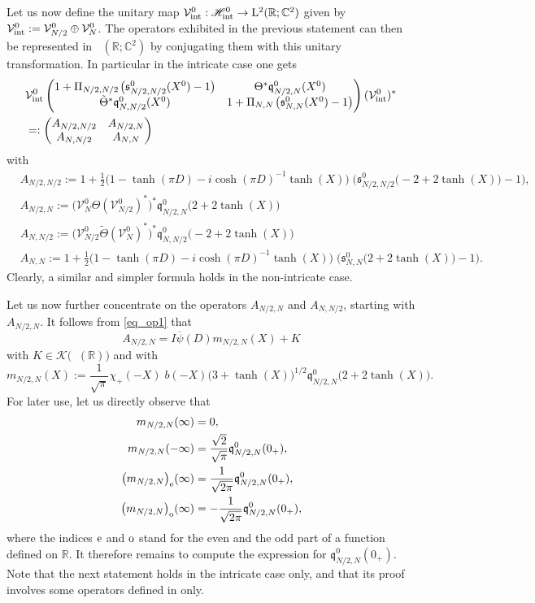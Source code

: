 \documentclass[11pt]{article}
\def\C{\mathbb C}
\def\Hrond{\mathscr H}
\def\K{\mathscr K}
\def\R{\mathbb R}
\def\s{\mathfrak s}
\def\V{\mathcal V}
\def\ltwo{\mathop{\mathrm{L}^2}\nolimits}
\def\q{\mathfrak{q}}
\begin{document}
Let us now define the unitary map 
$\V^0_{\rm int}: \Hrond^0_{\rm int} \to \ltwo(\R;\C^2)$ given by
$\V^0_{\rm int}:=\V_{N/2}^0\oplus \V_N^0$.
The operators exhibited in the previous statement can then be represented in 
$\ltwo(\R;\C^2)$ by conjugating them with this unitary transformation.
In particular in the intricate case one gets
\begin{align}\label{eq_def_block}
\nonumber & \V^0_{\rm int}\left(\begin{matrix}1+ \Pi_{N/2,N/2}\;\!\big(\s^0_{N/2,N/2}(X^0)-1\big)
& \Theta^* \q^0_{N/2,N}(X^0) \\
\tilde \Theta^* \q^0_{N,N/2}(X^0) & 1+ \Pi_{N,N}\;\!\big(\s^0_{N,N}(X^0)-1\big)
\end{matrix}\right) (\V^0_{\rm int})^* \\
& =:
\left(\begin{matrix} A_{N/2,N/2} & A_{N/2,N} \\
A_{N,N/2} & A_{N,N}
\end{matrix}\right)
\end{align}
with 
\begin{align*}
& A_{N/2,N/2}:=1+ \frac{1}{2}\big(1-\tanh(\pi D)-i\cosh(\pi D)^{-1}\tanh(X)\big)\;\!\big(\s^0_{N/2,N/2}\big(-2+2\tanh(X)\big)-1\big), \\
& A_{N/2,N}:= \big(\V^0_N \Theta(\V^0_{N/2})^*\big)^* \q^0_{N/2,N}\big(2+2\tanh(X)\big) \\
& A_{N,N/2}:= \big(\V_{N/2}^0\tilde \Theta (\V_N^0)^* \big)^* \q^0_{N,N/2}\big(-2+2\tanh(X)\big) \\
& A_{N,N}:=1+ \frac{1}{2}\big(1-\tanh(\pi D)-i\cosh(\pi D)^{-1}\tanh(X)\big)\;\!\big(\s^0_{N,N}\big(2+2\tanh(X)\big)-1\big).
\end{align*}
Clearly, a similar and simpler formula holds in the non-intricate case.

Let us now further concentrate on the operators $A_{N/2,N}$ and $A_{N,N/2}$, 
starting with $A_{N/2,N}$. It follows from \eqref{eq_op1} that 
\begin{equation}\label{eq_MA12}
A_{N/2,N} = I\overline{\psi}(D) m_{N/2,N}(X) + K
\end{equation}
with $K\in \K\big(\ltwo(\R)\big)$ and with
$$
m_{N/2,N}(X) := \frac{1}{\sqrt{\pi}} \chi_+(-X) \;\!b(-X) \big(3+\tanh(X)\big)^{1/2} \q^0_{N/2,N}\big(2+2\tanh(X)\big). 
$$
For later use, let us directly observe that
\begin{align*}
m_{N/2,N}(\infty) & = 0, \\
m_{N/2,N}(-\infty) & = \frac{\sqrt{2}}{\sqrt{\pi}}\q^0_{N/2,N}(0_+), \\
\big(m_{N/2,N}\big)_{\rm e}(\infty) & = \frac{1}{\sqrt{2\pi}}\q^0_{N/2,N}(0_+), \\
\big(m_{N/2,N}\big)_{\rm o}(\infty) & = -\frac{1}{\sqrt{2\pi}}\q^0_{N/2,N}(0_+), 
\end{align*}
where the indices $\rm e$ and $\rm o$ stand for the even and the odd part of a function defined on $\R$.
It therefore remains to compute the expression for $\q^0_{N/2,N}(0_+)$.
Note that the next statement holds in the intricate case only, 
and that its proof involves some operators defined in \cite{NRT} only.
\end{document}
